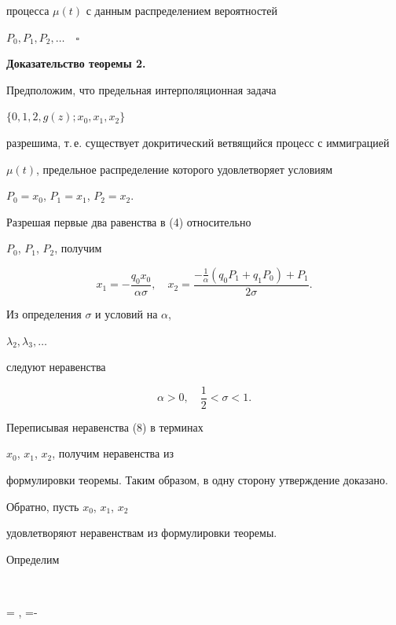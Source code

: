 процесса $\mu (t)$ с данным распределением вероятностей


$P_0, P_1, P_2, \dotsc\quad\square $


\medskip





{\bf Доказательство теоремы 2.}


Предположим, что предельная интерполяционная задача 


$\{0, 1, 2, g(z); x_0, x_1, x_2 \}$


разрешима, т.\,е. существует докритический ветвящийся процесс с иммиграцией


$\mu (t)$, предельное распределение которого удовлетворяет условиям


$P_0=x_0$, $P_1=x_1$, $P_2=x_2$.


Разрешая первые два равенства в (4) относительно


$P_0$, $P_1$, $P_2$, получим


$$


x_1=-\frac {q_0x_0}{\alpha \sigma },


\quad x_2=\frac {-\frac 1{\alpha }(q_0P_1+q_1P_0)


+P_1}{2\sigma }.


$$


Из определения $\sigma $ и условий на $\alpha$,


$\lambda_2, \lambda_3, \dotsc $


следуют неравенства


\begin{equation}


\alpha >0, \quad \frac 1{2}<\sigma <1.


\end{equation}


Переписывая неравенства (8) в терминах


$x_0$, $x_1$, $x_2$, получим неравенства из


формулировки теоремы. Таким образом, в одну сторону утверждение доказано.





Обратно, пусть $x_0$, $x_1$, $x_2$


удовлетворяют неравенствам из формулировки теоремы.


Определим


$$


\alpha = , \quad \sigma =-


